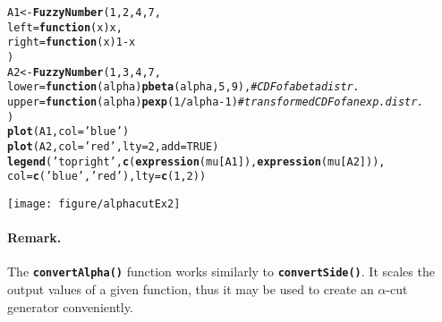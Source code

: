 \documentclass[11pt]{article}\usepackage[]{graphicx}\usepackage[]{color}
\makeatletter
\newcommand{\hlnum}[1]{\textcolor[rgb]{0.686,0.059,0.569}{#1}}%
\newcommand{\hlstr}[1]{\textcolor[rgb]{0.192,0.494,0.8}{#1}}%
\newcommand{\hlcom}[1]{\textcolor[rgb]{0.678,0.584,0.686}{\textit{#1}}}%
\newcommand{\hlopt}[1]{\textcolor[rgb]{0,0,0}{#1}}%
\newcommand{\hlstd}[1]{\textcolor[rgb]{0.345,0.345,0.345}{#1}}%
\newcommand{\hlkwa}[1]{\textcolor[rgb]{0.161,0.373,0.58}{\textbf{#1}}}%
\newcommand{\hlkwb}[1]{\textcolor[rgb]{0.69,0.353,0.396}{#1}}%
\newcommand{\hlkwc}[1]{\textcolor[rgb]{0.333,0.667,0.333}{#1}}%
\newcommand{\hlkwd}[1]{\textcolor[rgb]{0.737,0.353,0.396}{\textbf{#1}}}%
\newenvironment{kframe}{%
 \def\at@end@of@kframe{}%
 \ifinner\ifhmode%
  \def\at@end@of@kframe{\end{minipage}}%
  \begin{minipage}{\columnwidth}%
 \fi\fi%
 \def\FrameCommand##1{\hskip\@totalleftmargin \hskip-\fboxsep
 \colorbox{shadecolor}{##1}\hskip-\fboxsep
     \hskip-\linewidth \hskip-\@totalleftmargin \hskip\columnwidth}%
 \MakeFramed {\advance\hsize-\width
   \@totalleftmargin\z@ \linewidth\hsize
   \@setminipage}}%
 {\par\unskip\endMakeFramed%
 \at@end@of@kframe}
\newenvironment{knitrout}{}{} %
\newcommand{\func}[1]{\texttt{\hlkwd{#1}}}
\makeatother
\begin{document}
\begin{knitrout}\small
{}\color{fgcolor}\begin{kframe}
\begin{alltt}
\hlstd{A1} \hlkwb{<-} \hlkwd{FuzzyNumber}\hlstd{(}\hlnum{1}\hlstd{,} \hlnum{2}\hlstd{,} \hlnum{4}\hlstd{,} \hlnum{7}\hlstd{,}
    \hlkwc{left}\hlstd{=}\hlkwa{function}\hlstd{(}\hlkwc{x}\hlstd{) x,}
   \hlkwc{right}\hlstd{=}\hlkwa{function}\hlstd{(}\hlkwc{x}\hlstd{)} \hlnum{1}\hlopt{-}\hlstd{x}
\hlstd{)}
\hlstd{A2} \hlkwb{<-} \hlkwd{FuzzyNumber}\hlstd{(}\hlnum{1}\hlstd{,} \hlnum{3}\hlstd{,} \hlnum{4}\hlstd{,} \hlnum{7}\hlstd{,}
   \hlkwc{lower}\hlstd{=}\hlkwa{function}\hlstd{(}\hlkwc{alpha}\hlstd{)} \hlkwd{pbeta}\hlstd{(alpha,} \hlnum{5}\hlstd{,} \hlnum{9}\hlstd{),} \hlcom{# CDF of a beta distr.}
   \hlkwc{upper}\hlstd{=}\hlkwa{function}\hlstd{(}\hlkwc{alpha}\hlstd{)} \hlkwd{pexp}\hlstd{(}\hlnum{1}\hlopt{/}\hlstd{alpha}\hlopt{-}\hlnum{1}\hlstd{)} \hlcom{# transformed CDF of an exp. distr.}
\hlstd{)}
\hlkwd{plot}\hlstd{(A1,} \hlkwc{col}\hlstd{=}\hlstr{'blue'}\hlstd{)}
\hlkwd{plot}\hlstd{(A2,} \hlkwc{col}\hlstd{=}\hlstr{'red'}\hlstd{,} \hlkwc{lty}\hlstd{=}\hlnum{2}\hlstd{,} \hlkwc{add}\hlstd{=}\hlnum{TRUE}\hlstd{)}
\hlkwd{legend}\hlstd{(}\hlstr{'topright'}\hlstd{,} \hlkwd{c}\hlstd{(}\hlkwd{expression}\hlstd{(mu[A1]),} \hlkwd{expression}\hlstd{(mu[A2])),}
   \hlkwc{col}\hlstd{=}\hlkwd{c}\hlstd{(}\hlstr{'blue'}\hlstd{,} \hlstr{'red'}\hlstd{),} \hlkwc{lty}\hlstd{=}\hlkwd{c}\hlstd{(}\hlnum{1}\hlstd{,}\hlnum{2}\hlstd{))}
\end{alltt}
\end{kframe}
\end{knitrout}

\begin{center}
\begin{knitrout}\small
{}\color{fgcolor}

{\centering \texttt{[image: figure/alphacutEx2]} 

}



\end{knitrout}
\end{center}




\paragraph{Remark.}
The \func{convertAlpha()} function
works similarly to \func{convertSide()}.
It scales the output values
of a given function, thus it may be used to create
an $\alpha$-cut generator conveniently.
\end{document}
